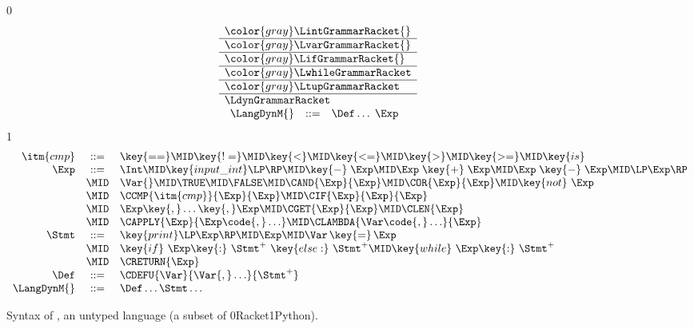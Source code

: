 \documentclass[7x10]{TimesAPriori_MIT}%
\newcommand{\gray}[1]{{\color{gray} #1}}
\def\racketEd{0}
\def\pythonEd{1}
\def\edition{1}
\newcommand{\racket}[1]{{\if\edition\racketEd{#1}\fi}}
\newcommand{\pythonColor}[0]{}
\newcommand{\python}[1]{{\if\edition\pythonEd\pythonColor #1\fi}}
\numberwithin{theorem}{chapter}
\numberwithin{definition}{chapter}
\numberwithin{equation}{chapter}
\begin{document}
\begin{figure}[tp]
  \centering
  \begin{tcolorbox}[colback=white]  
    \small
{\if\edition\racketEd    
\[
\begin{array}{l}
  \gray{\LintGrammarRacket{}} \\ \hline
  \gray{\LvarGrammarRacket{}} \\ \hline
  \gray{\LifGrammarRacket{}} \\ \hline
  \gray{\LwhileGrammarRacket} \\ \hline
  \gray{\LtupGrammarRacket} \\ \hline
  \LdynGrammarRacket \\
\begin{array}{rcl}
\LangDynM{}  &::=& \Def\ldots\; \Exp
\end{array}
\end{array}
\]
\fi}
{\if\edition\pythonEd\pythonColor
\[
\begin{array}{rcl}
  \itm{cmp} &::= & \key{==} \MID \key{!=} \MID \key{<} \MID \key{<=} \MID \key{>} \MID \key{>=} \MID \key{is} \\
  \Exp &::=& \Int \MID \key{input\_int}\LP\RP \MID \key{-}\;\Exp \MID \Exp \; \key{+} \; \Exp \MID \Exp \; \key{-} \; \Exp \MID \LP\Exp\RP \\
  &\MID& \Var{} \MID \TRUE \MID \FALSE \MID \CAND{\Exp}{\Exp}
  \MID \COR{\Exp}{\Exp} \MID \key{not}~\Exp \\
  &\MID& \CCMP{\itm{cmp}}{\Exp}{\Exp}
      \MID \CIF{\Exp}{\Exp}{\Exp} \\
  &\MID& \Exp \key{,} \ldots \key{,} \Exp \MID \CGET{\Exp}{\Exp}
      \MID \CLEN{\Exp}  \\
   &\MID& \CAPPLY{\Exp}{\Exp\code{,} \ldots} 
    \MID \CLAMBDA{\Var\code{, }\ldots}{\Exp}\\
  \Stmt &::=& \key{print}\LP \Exp \RP \MID \Exp 
    \MID \Var\mathop{\key{=}}\Exp \\
   &\MID& \key{if}~ \Exp \key{:}~ \Stmt^{+} ~\key{else:}~ \Stmt^{+} 
   \MID \key{while}~ \Exp \key{:}~ \Stmt^{+} \\
    &\MID& \CRETURN{\Exp} \\
   \Def &::=& \CDEFU{\Var}{\Var{,} \ldots}{\Stmt^{+}} \\
  \LangDynM{} &::=& \Def\ldots \Stmt\ldots
\end{array}
\]
\fi}
  \end{tcolorbox}
\caption{Syntax of \LangDyn{}, an untyped language (a subset of \racket{Racket}\python{Python}).}
\label{fig:r7-concrete-syntax}
\end{figure}
\end{document}
